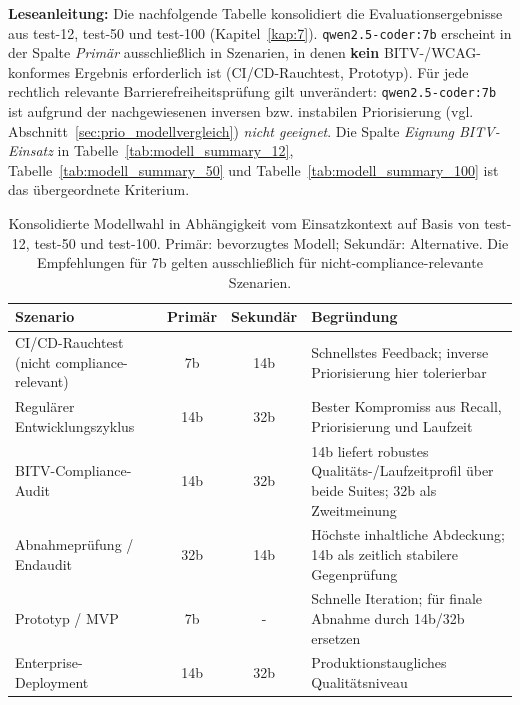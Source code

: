 \clearpage
{}\label{app:einsatzempfehlungen}

\textbf{Leseanleitung:} Die nachfolgende Tabelle konsolidiert die Evaluationsergebnisse aus test-12, test-50 und test-100 (Kapitel~\ref{kap:7}). \texttt{qwen2.5-coder:7b} erscheint in der Spalte \textit{Primär} ausschließlich in Szenarien, in denen \textbf{kein} \ac{BITV}-/\ac{WCAG}-konformes Ergebnis erforderlich ist (CI/CD-Rauchtest, Prototyp). Für jede rechtlich relevante Barrierefreiheitsprüfung gilt unverändert: \texttt{qwen2.5-coder:7b} ist aufgrund der nachgewiesenen inversen bzw. instabilen Priorisierung (vgl. Abschnitt~\ref{sec:prio_modellvergleich}) \textit{nicht geeignet}. Die Spalte \textit{Eignung BITV-Einsatz} in Tabelle~\ref{tab:modell_summary_12}, Tabelle~\ref{tab:modell_summary_50} und Tabelle~\ref{tab:modell_summary_100} ist das übergeordnete Kriterium.

\begin{table}[htbp]
\centering
\setlength{\tabcolsep}{4pt}
\renewcommand{\arraystretch}{1.2}
\caption[Modellempfehlungen nach Anwendungsszenario]{Konsolidierte Modellwahl in Abhängigkeit vom Einsatzkontext auf Basis von test-12, test-50 und test-100. Primär: bevorzugtes Modell; Sekundär: Alternative. Die Empfehlungen für 7b gelten ausschließlich für nicht-compliance-relevante Szenarien.}
\begin{tabular}{|p{5.0cm}|c|c|p{5.6cm}|}
\hline
\textbf{Szenario} & \textbf{Primär} & \textbf{Sekundär} & \textbf{Begründung} \\
\hline
CI/CD-Rauchtest (nicht compliance-relevant) & 7b & 14b & Schnellstes Feedback; inverse Priorisierung hier tolerierbar \\
\hline
Regulärer Entwicklungszyklus & 14b & 32b & Bester Kompromiss aus Recall, Priorisierung und Laufzeit \\
\hline
BITV-Compliance-Audit        & 14b & 32b & 14b liefert robustes Qualitäts-/Laufzeitprofil über beide Suites; 32b als Zweitmeinung \\
\hline
Abnahmeprüfung / Endaudit    & 32b & 14b & Höchste inhaltliche Abdeckung; 14b als zeitlich stabilere Gegenprüfung \\
\hline
Prototyp / MVP               & 7b  & -  & Schnelle Iteration; für finale Abnahme durch 14b/32b ersetzen \\
\hline
Enterprise-Deployment        & 14b & 32b & Produktionstaugliches Qualitätsniveau \\
\hline
\end{tabular}
\label{tab:einsatzempfehlungen}
\end{table}

